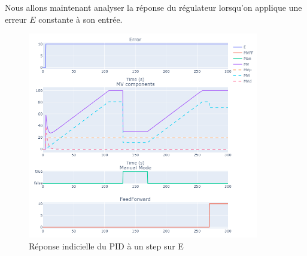 Nous allons maintenant analyser la réponse du régulateur lorsqu'on applique une erreur $E$ constante à son entrée.
\begin{figure}[H]
    \centering
    \includegraphics[width=0.9\textwidth]{../Plots/PID/PID_Response_error_step.png}
    \caption{Réponse indicielle du PID à un step sur E}
    \label{fig:Step_Response_PID}
\end{figure}

